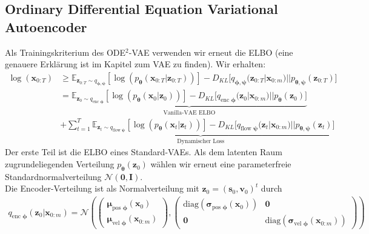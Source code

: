 \documentclass[12pt]{article}
\newcommand{\E}{\mathbb{E}}
\begin{document}
	\subsection[ODE$^2$-VAE]{Ordinary Differential Equation Variational Autoencoder}
	Als Trainingskriterium des ODE$^2$-VAE verwenden wir erneut die ELBO (eine genauere Erklärung ist im Kapitel zum VAE zu finden). 
	Wir erhalten:
	\begin{align*}
	\log\left(\mathbf{x}_{0:T}\right)&\ge \E_{\mathbf{z}_{0:T}\sim q_{\boldsymbol\phi,\boldsymbol\psi}}
	\left[\log\left(p_{\boldsymbol\theta}\left(\mathbf{x}_{0:T}|\mathbf{z}_{0:T}\right)\right)\right] - D_{KL}\big[q_{\boldsymbol\phi,\boldsymbol\psi}(\mathbf{z}_{0:T}|\mathbf{x}_{0:m})||p_{\boldsymbol\theta,\boldsymbol\psi}(\mathbf{z}_{0:T})\big]\\
	&=\underbrace{\E_{\mathbf{z}_{0}\sim q_{\text{enc }\boldsymbol\phi}}
	\left[\log\left(p_{\boldsymbol\theta}\left(\mathbf{x}_{0}|\mathbf{z}_{0}\right)\right)\right] - D_{KL}\big[q_{\text{enc }\boldsymbol\phi}(\mathbf{z}_{0}|\mathbf{x}_{0:m})||p_{\boldsymbol\theta}(\mathbf{z}_{0})\big]}_{\text{Vanilla-VAE ELBO}}\\ &+ \underbrace{\sum_{t=1}^T \E_{\mathbf{z}_{t}\sim q_{\text{flow }\boldsymbol\psi}}
	\left[\log\left(p_{\boldsymbol\theta}\left(\mathbf{x}_{t}|\mathbf{z}_{t}\right)\right)\right] - D_{KL}\big[q_{\text{flow }\boldsymbol\psi}(\mathbf{z}_{t}|\mathbf{x}_{0:m})||p_{\boldsymbol\theta,\boldsymbol\psi}(\mathbf{z}_{t})\big]}_{\text{Dynamischer Loss}}
	\end{align*}	
	Der erste Teil ist die ELBO eines Standard-VAEs.
	Als dem latenten Raum zugrundeliegenden Verteilung $p_{\boldsymbol\theta}(\mathbf{z}_{0})$ wählen wir erneut eine parameterfreie Standardnormalverteilung $\mathcal{N}(\mathbf{0},\mathbf{I})$.\\
	Die Encoder-Verteilung ist als Normalverteilung mit $\mathbf{z}_{0} = (\mathbf{s}_{0},\mathbf{v}_{0})^t$ durch
	\begin{align*}
	q_{\text{enc }\boldsymbol\phi}(\mathbf{z}_{0}|\mathbf{x}_{0:m}) =	 
	\mathcal{N}\left(\left(\begin{array}{cc} 
	\boldsymbol\mu_{\text{pos }\boldsymbol\phi}(\textbf{x}_{0}) \\ 
	\boldsymbol\mu_{\text{vel }\boldsymbol\phi}(\textbf{x}_{0:m}) 
	\end{array}\right),\left(\begin{array}{cc} 
	\text{diag}(\boldsymbol\sigma_{\text{pos }\boldsymbol\phi}(\textbf{x}_{0})) & 
	\mathbf{0}\\ 
	\mathbf{0} & 
	\text{diag}(\boldsymbol\sigma_{\text{vel }\boldsymbol\phi}(\textbf{x}_{0:m}))  
	\end{array}\right)\right)
	\end{align*}	
\end{document}
